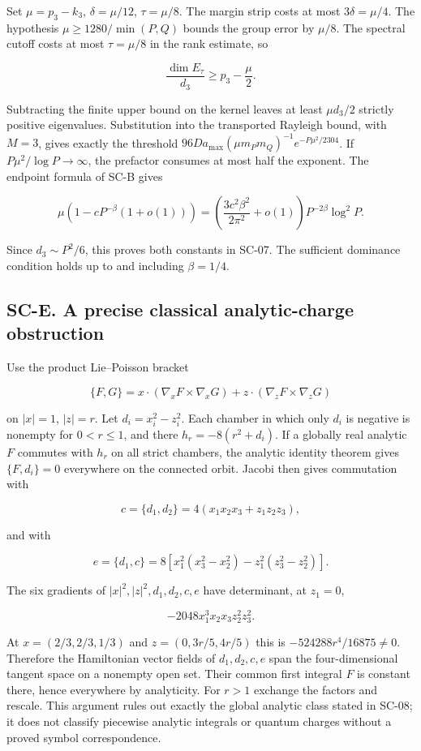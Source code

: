 Set \(\mu=p_3-k_3\), \(\delta=\mu/12\), \(\tau=\mu/8\). The margin strip costs at most \(3\delta=\mu/4\). The hypothesis \(\mu\geq1280/\min(P,Q)\) bounds the group error by \(\mu/8\). The spectral cutoff costs at most \(\tau=\mu/8\) in the rank estimate, so

\[
\frac{\dim E_\tau}{d_3}\geq p_3-\frac{\mu}{2}.
\]

Subtracting the finite upper bound on the kernel leaves at least \(\mu d_3/2\) strictly positive eigenvalues. Substitution into the transported Rayleigh bound, with \(M=3\), gives exactly the threshold \(96Da_{\max}(\mu m_Pm_Q)^{-1}e^{-P\mu^2/2304}\). If \(P\mu^2/\log P\to\infty\), the prefactor consumes at most half the exponent. The endpoint formula of SC-B gives

\[
\mu(1-cP^{-\beta}(1+o(1)))
=\left(\frac{3c^2\beta^2}{2\pi^2}+o(1)\right)
P^{-2\beta}\log^2P.
\]

Since \(d_3\sim P^2/6\), this proves both constants in SC-07. The sufficient dominance condition holds up to and including \(\beta=1/4\).

\hypertarget{sc-e.-a-precise-classical-analytic-charge-obstruction}{%
\subsection{SC-E. A precise classical analytic-charge obstruction}\label{sc-e.-a-precise-classical-analytic-charge-obstruction}}

Use the product Lie--Poisson bracket

\[
\{F,G\}=x\cdot(\nabla_xF\times\nabla_xG)
+z\cdot(\nabla_zF\times\nabla_zG)
\]

on \(|x|=1\), \(|z|=r\). Let \(d_i=x_i^2-z_i^2\). Each chamber in which only \(d_i\) is negative is nonempty for \(0<r\leq1\), and there \(h_r=-8(r^2+d_i)\). If a globally real analytic \(F\) commutes with \(h_r\) on all strict chambers, the analytic identity theorem gives \(\{F,d_i\}=0\) everywhere on the connected orbit. Jacobi then gives commutation with

\[
c=\{d_1,d_2\}=4(x_1x_2x_3+z_1z_2z_3),
\]

and with

\[
e=\{d_1,c\}
=8[x_1^2(x_3^2-x_2^2)-z_1^2(z_3^2-z_2^2)].
\]

The six gradients of \(|x|^2,|z|^2,d_1,d_2,c,e\) have determinant, at \(z_1=0\),

\[
-2048x_1^3x_2x_3z_2^2z_3^2.
\]

At \(x=(2/3,2/3,1/3)\) and \(z=(0,3r/5,4r/5)\) this is \(-524288r^4/16875\ne0\). Therefore the Hamiltonian vector fields of \(d_1,d_2,c,e\) span the four-dimensional tangent space on a nonempty open set. Their common first integral \(F\) is constant there, hence everywhere by analyticity. For \(r>1\) exchange the factors and rescale. This argument rules out exactly the global analytic class stated in SC-08; it does not classify piecewise analytic integrals or quantum charges without a proved symbol correspondence.

